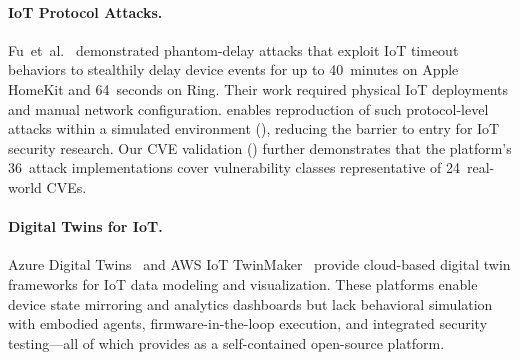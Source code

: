 \paragraph{IoT Protocol Attacks.}
Fu~et~al.~\cite{phantom-delay} demonstrated phantom-delay attacks
that exploit IoT timeout behaviors to stealthily delay device events
for up to 40~minutes on Apple HomeKit and 64~seconds on Ring.
Their work required physical IoT deployments and manual network
configuration.  \sys{} enables reproduction of such protocol-level
attacks within a simulated environment
(), reducing the barrier to entry for
IoT security research.  Our CVE validation ()
further demonstrates that the platform's 36~attack implementations
cover vulnerability classes representative of 24~real-world CVEs.

\paragraph{Digital Twins for IoT.}
Azure Digital Twins~\cite{azure-digital-twins} and AWS IoT
TwinMaker~\cite{aws-iot-twinmaker} provide cloud-based digital twin
frameworks for IoT data modeling and visualization.  These platforms
enable device state mirroring and analytics dashboards but lack
behavioral simulation with embodied agents, firmware-in-the-loop
execution, and integrated security testing---all of which \sys{}
provides as a self-contained open-source platform.
